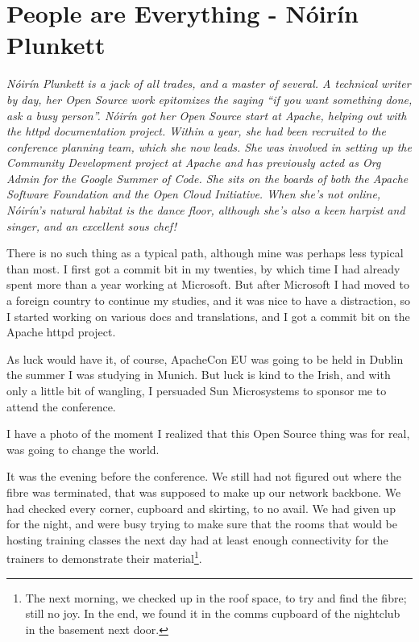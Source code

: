 \chapter{People are Everything - Nóirín Plunkett}

\textit{Nóirín Plunkett is a jack of all trades, and a master of several. A
technical writer by day, her Open Source work epitomizes the saying ``if you
want something done, ask a busy person''.
Nóirín got her Open Source start at Apache, helping out with the httpd
documentation project. Within a year, she had been recruited to the conference
planning team, which she now leads. She was involved in setting up the Community
Development project at Apache and has previously acted as Org Admin for the Google
Summer of Code. She sits on the boards of
both the Apache Software Foundation and the Open Cloud Initiative.
When she’s not online, Nóirín’s natural habitat is the dance floor, although
she’s also a keen harpist and singer, and an excellent sous chef!}

There is no such thing as a typical path, although mine was perhaps
less typical than most. I first got a commit bit in my twenties, by
which time I had already spent more than a year working at Microsoft.
But after Microsoft I had moved to a foreign country to continue my
studies, and it was nice to have a distraction, so I started working
on various docs and translations, and I got a commit bit on the Apache
httpd project.

As luck would have it, of course, ApacheCon EU was going to be held in
Dublin the summer I was studying in Munich. But luck is kind to the
Irish, and with only a little bit of wangling, I persuaded Sun
Microsystems to sponsor me to attend the conference.

I have a photo of the
moment I realized that this Open Source thing was for real, was going
to change the world.

It was the evening before the conference. We still had not figured out
where the fibre was terminated, that was supposed to make up our
network backbone. We had checked every corner, cupboard and skirting, to
no avail. We had given up for the night, and were busy trying to make
sure that the rooms that would be hosting training classes the next
day had at least enough connectivity for the trainers to demonstrate
their material\footnote{The next morning, we checked up in the roof space, to
try and find
the fibre; still no joy. In the end, we found it in the comms cupboard
of the nightclub in the basement next door.}.

